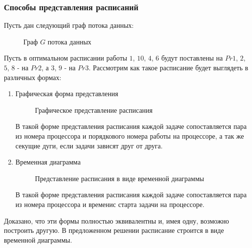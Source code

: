\subsubsection*{Способы представления расписаний}
Пусть дан следующий граф потока данных:
\begin{figure}[H]
    \caption{Граф $G$ потока данных}
\end{figure}
Пусть в оптимальном расписании работы $1$, $10$, $4$, $6$ будут поставлены на $Pr1$, $2$, $5$, $8$ - на $Pr2$, а $3$, $9$ - на $Pr3$. Рассмотрим как такое расписание будет выглядеть в различных формах:
\begin{enumerate}
    \item Графическая форма представления
    \begin{figure}[H]
        \caption{Графическое представление расписания}
    \end{figure}
    В такой форме представления расписания каждой задаче сопоставляется пара из номера процессора и порядкового номера работы на процессоре, а так же секущие дуги, если задачи зависят друг от друга. 
    \item Временная диаграмма
    \begin{figure}[H]
        \caption{Представление расписания в виде временной диаграммы}
    \end{figure}
    В такой форме представления расписания каждой задаче сопоставляется пара из номера процессора и временис старта задачи на процессоре.
\end{enumerate}
Доказано, что эти формы полностью эквивалентны и, имея одну, возможно построить другую. В предложенном решении расписание строится в виде временной диаграммы.

